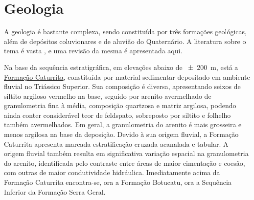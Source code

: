 \section{Geologia}
\label{sec:chap02-geologia}

A geologia é bastante complexa, sendo constituída por três formações geológicas, além de depósitos coluvionares 
e de aluvião do Quaternário. A literatura sobre o tema é vasta \cite{Bortoluzzi1974, Brasil1980, 
GasparettoEtAl1988, MacielFilho1990, PieriniEtAl2002, MarquesEtAl2005, Milani2005, Pinto2005, CPRM2007, 
Pedron2007, Sartori2009, NascimentoEtAl2010, WerlangEtAl2010, Machado2012, PedronEtAl2012}, e uma revisão da 
mesma é apresentada aqui.


\def\caturrita{\href{https://pt.wikipedia.org/wiki/Forma\%C3\%A7\%C3\%A3o_Caturrita}{Formação Caturrita}}

Na base da sequência estratigráfica, em elevações abaixo de \SI{\pm200}{\metre}, está a \caturrita{}, 
constituída por material sedimentar depositado em ambiente fluvial no Triássico Superior. Sua composição é 
diversa, apresentando seixos de siltito argiloso vermelho na base, seguido por arenito avermelhado de 
granulometria fina à média, composição quartzosa e matriz argilosa, podendo ainda conter considerável teor de 
feldspato, sobreposto por siltito e folhelho também avermelhados. Em geral, a granulometria do arenito é mais 
grosseira e menos argilosa na base da deposição. Devido à sua origem fluvial, a Formação Caturrita apresenta 
marcada estratificação cruzada acanalada e tabular. A origem fluvial também resulta em significativa variação 
espacial na granulometria do arenito, identificada pelo contraste entre áreas de maior cimentação e coesão, com 
outras de maior condutividade hidráulica. Imediatamente acima da Formação Caturrita encontra-se, ora a 
Formação Botucatu, ora a Sequência Inferior da Formação Serra Geral.


